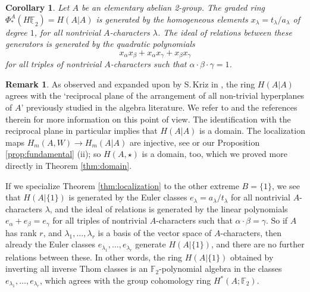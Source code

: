 \documentclass{amsart}[12pt]
\newcommand{\mF}{{\mathbb F}}
\renewcommand{\to}{\longrightarrow}
\numberwithin{equation}{section}
\newtheorem{cor}[equation]{Corollary}
\theoremstyle{definition}
\newtheorem{rk}[equation]{Remark}
\begin{document}
\begin{cor}\cite[Theorem 2]{holler-kriz}\label{cor:holler-kriz}
  Let $A$ be an elementary abelian 2-group.
  The graded ring $\Phi^A_*(H\underline\mF_2)=H(A|A)$ is generated by
  the homogeneous elements $x_\lambda=t_\lambda/a_\lambda$ of degree $1$,
  for all nontrivial $A$-characters $\lambda$.
  The ideal of relations between these generators is generated by
   the quadratic polynomials
   \[ x_\alpha x_\beta + x_\alpha x_\gamma + x_\beta x_\gamma \]
   for all triples
   of nontrivial $A$-characters such that $\alpha\cdot\beta\cdot\gamma=1$.
\end{cor}



\begin{rk} \label{rk:domain}
  As observed and expanded upon by S.\,Kriz in \cite{skriz}, the ring $H(A|A)$ agrees
  with the `reciprocal plane of the arrangement of all non-trivial hyperplanes of $A$'
  previously studied in the algebra literature.
  We refer to \cite{skriz} and the references therein for more information on this point of view.
  The identification with the reciprocal plane in particular implies that $H(A|A)$ is a domain.
  The localization maps $H_m(A,W)\to H_m(A|A)$ are injective,
  see \cite[Theorem 5 (ii)]{holler-kriz} or our Proposition \ref{prop:fundamental} (ii);
  so $H(A,\star)$ is a domain, too, 
  which we proved more directly in Theorem \ref{thm:domain}.
\end{rk}

If we specialize Theorem \ref{thm:localization} to the other extreme $B=\{1\}$,
we see that $H(A|\{1\})$ is generated by the Euler classes $e_\lambda=a_\lambda/t_\lambda$
for all nontrivial $A$-characters $\lambda$, and the ideal of relations is
generated by the linear polynomials $e_\alpha+e_\beta=e_\gamma$
for all triples of nontrivial $A$-characters such that $\alpha\cdot\beta=\gamma$.
So if $A$ has rank $r$, and $\lambda_1,\dots,\lambda_r$ is a basis of the vector space
of $A$-characters, then already the Euler classes $e_{\lambda_1},\dots,e_{\lambda_r}$
generate $H(A|\{1\})$, and there are no further relations between these.
In other words, the ring $H(A|\{1\})$ obtained by inverting all
inverse Thom classes is an $\mF_2$-polynomial algebra in the classes 
$e_{\lambda_1},\dots,e_{\lambda_r}$, which agrees with the group cohomology ring $H^*(A;\mF_2)$.
\end{document}
